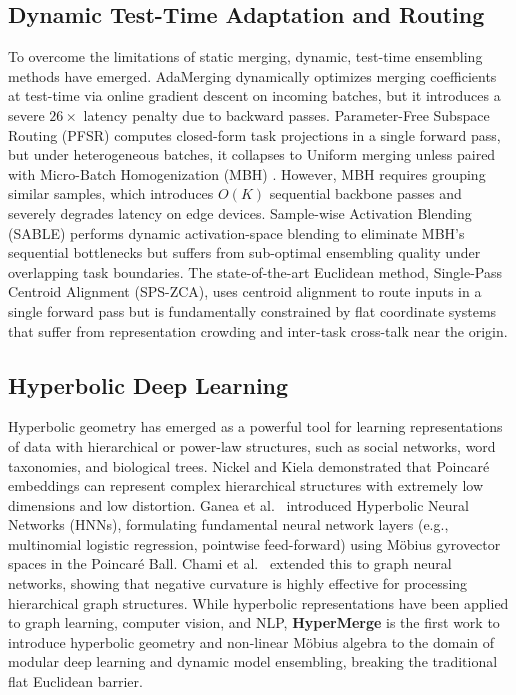 \subsection{Dynamic Test-Time Adaptation and Routing}
To overcome the limitations of static merging, dynamic, test-time ensembling methods have emerged. AdaMerging \cite{pfsr2025} dynamically optimizes merging coefficients at test-time via online gradient descent on incoming batches, but it introduces a severe $26\times$ latency penalty due to backward passes. Parameter-Free Subspace Routing (PFSR) \cite{pfsr2025} computes closed-form task projections in a single forward pass, but under heterogeneous batches, it collapses to Uniform merging unless paired with Micro-Batch Homogenization (MBH) \cite{mbh2025}. However, MBH requires grouping similar samples, which introduces $O(K)$ sequential backbone passes and severely degrades latency on edge devices. Sample-wise Activation Blending (SABLE) performs dynamic activation-space blending to eliminate MBH's sequential bottlenecks but suffers from sub-optimal ensembling quality under overlapping task boundaries. The state-of-the-art Euclidean method, Single-Pass Centroid Alignment (SPS-ZCA), uses centroid alignment to route inputs in a single forward pass but is fundamentally constrained by flat coordinate systems that suffer from representation crowding and inter-task cross-talk near the origin.

\subsection{Hyperbolic Deep Learning}
Hyperbolic geometry has emerged as a powerful tool for learning representations of data with hierarchical or power-law structures, such as social networks, word taxonomies, and biological trees. Nickel and Kiela \cite{nickel2017poincare} demonstrated that Poincaré embeddings can represent complex hierarchical structures with extremely low dimensions and low distortion. Ganea et al.\ \cite{ganea2018hyperbolic} introduced Hyperbolic Neural Networks (HNNs), formulating fundamental neural network layers (e.g., multinomial logistic regression, pointwise feed-forward) using Möbius gyrovector spaces in the Poincaré Ball. Chami et al.\ \cite{chami2019hyperbolic} extended this to graph neural networks, showing that negative curvature is highly effective for processing hierarchical graph structures. While hyperbolic representations have been applied to graph learning, computer vision, and NLP, \textbf{HyperMerge} is the first work to introduce hyperbolic geometry and non-linear Möbius algebra to the domain of modular deep learning and dynamic model ensembling, breaking the traditional flat Euclidean barrier.
